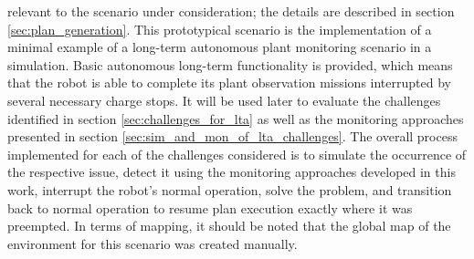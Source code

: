 \documentclass[english, master, utf8]{base/thesis_KBS}
\begin{document}
relevant to the scenario under consideration; the details are described in section \ref{sec:plan_generation}. This prototypical scenario is the implementation of a minimal 
example of a long-term autonomous plant monitoring scenario in a simulation. Basic autonomous long-term functionality is provided, which means that the robot is able to 
complete its plant observation missions interrupted by several necessary charge stops. It will be used later to evaluate the challenges identified in section 
\ref{sec:challenges_for_lta} as well as the monitoring approaches presented in section \ref{sec:sim_and_mon_of_lta_challenges}.
The overall process implemented for each of the challenges considered is to simulate the occurrence of the respective issue, detect it using
the monitoring approaches developed in this work, interrupt the robot's normal operation, solve the problem, and transition back to normal operation to resume 
plan execution exactly where it was preempted. In terms of mapping, it should be noted that the global map of the environment for this scenario was created manually.
\end{document}
